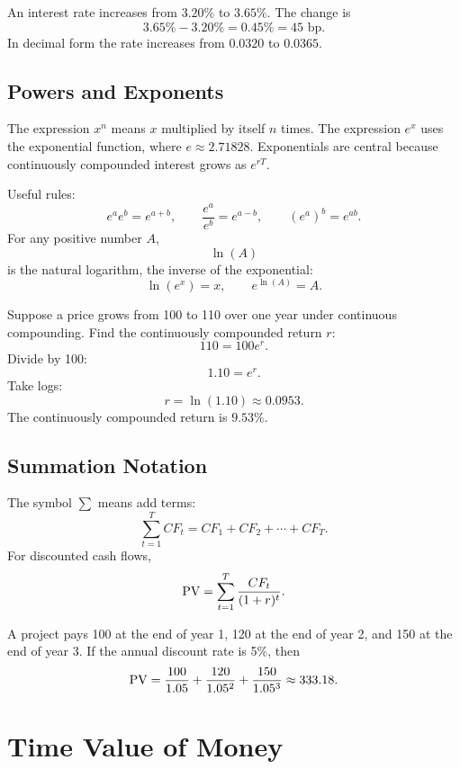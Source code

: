 \begin{exmp}
An interest rate increases from $3.20\%$ to $3.65\%$. The change is
\[
    3.65\%-3.20\%=0.45\%=45\text{ bp}.
\]
In decimal form the rate increases from $0.0320$ to $0.0365$.
\end{exmp}

\subsection{Powers and Exponents}

The expression $x^n$ means $x$ multiplied by itself $n$ times. The expression
$e^x$ uses the exponential function, where $e\approx 2.71828$. Exponentials are
central because continuously compounded interest grows as $e^{rT}$.

Useful rules:
\[
    e^a e^b = e^{a+b}, \qquad \frac{e^a}{e^b}=e^{a-b}, \qquad (e^a)^b=e^{ab}.
\]
For any positive number $A$,
\[
    \ln(A)
\]
is the natural logarithm, the inverse of the exponential:
\[
    \ln(e^x)=x, \qquad e^{\ln(A)}=A.
\]

\begin{exmp}
Suppose a price grows from 100 to 110 over one year under continuous compounding.
Find the continuously compounded return $r$:
\[
    110=100e^r.
\]
Divide by 100:
\[
    1.10=e^r.
\]
Take logs:
\[
    r=\ln(1.10)\approx 0.0953.
\]
The continuously compounded return is $9.53\%$.
\end{exmp}

\subsection{Summation Notation}

The symbol $\sum$ means add terms:
\[
    \sum_{t=1}^{T} CF_t
    =
    CF_1+CF_2+\cdots+CF_T.
\]
For discounted cash flows,
\[
    \mathrm{PV}=\sum_{t=1}^{T}\frac{CF_t}{(1+r)^t}.
\]

\begin{exmp}
A project pays 100 at the end of year 1, 120 at the end of year 2, and 150 at
the end of year 3. If the annual discount rate is 5\%, then
\[
    \mathrm{PV} = \frac{100}{1.05}+\frac{120}{1.05^2}+\frac{150}{1.05^3}
    \approx 333.18.
\]
\end{exmp}

\section{Time Value of Money}

